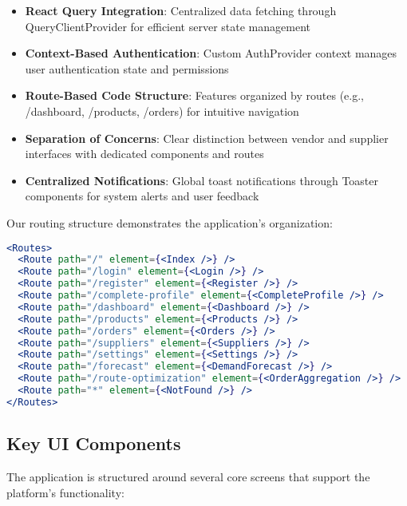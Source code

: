 \begin{itemize}
    \item \textbf{React Query Integration}: Centralized data fetching through QueryClientProvider for efficient server state management
    \item \textbf{Context-Based Authentication}: Custom AuthProvider context manages user authentication state and permissions
    \item \textbf{Route-Based Code Structure}: Features organized by routes (e.g., /dashboard, /products, /orders) for intuitive navigation
    \item \textbf{Separation of Concerns}: Clear distinction between vendor and supplier interfaces with dedicated components and routes
    \item \textbf{Centralized Notifications}: Global toast notifications through Toaster components for system alerts and user feedback
\end{itemize}

Our routing structure demonstrates the application's organization:

\begin{lstlisting}[language=jsx, basicstyle=\small\ttfamily]
<Routes>
  <Route path="/" element={<Index />} />
  <Route path="/login" element={<Login />} />
  <Route path="/register" element={<Register />} />
  <Route path="/complete-profile" element={<CompleteProfile />} />
  <Route path="/dashboard" element={<Dashboard />} />
  <Route path="/products" element={<Products />} />
  <Route path="/orders" element={<Orders />} />
  <Route path="/suppliers" element={<Suppliers />} />
  <Route path="/settings" element={<Settings />} />
  <Route path="/forecast" element={<DemandForecast />} />
  <Route path="/route-optimization" element={<OrderAggregation />} />
  <Route path="*" element={<NotFound />} />
</Routes>
\end{lstlisting}

\subsection{Key UI Components}

The application is structured around several core screens that support the platform's functionality:

